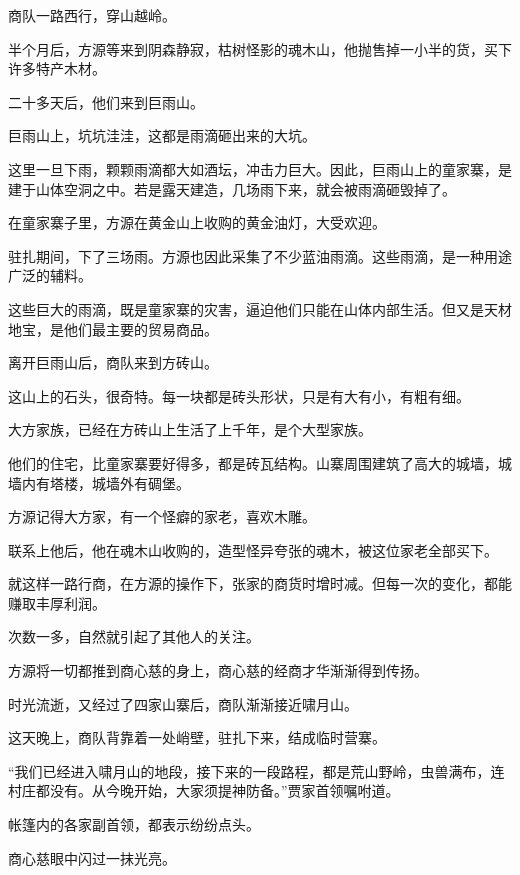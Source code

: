 
\begin{this_body}



商队一路西行，穿山越岭。

半个月后，方源等来到阴森静寂，枯树怪影的魂木山，他抛售掉一小半的货，买下许多特产木材。

二十多天后，他们来到巨雨山。

巨雨山上，坑坑洼洼，这都是雨滴砸出来的大坑。

这里一旦下雨，颗颗雨滴都大如酒坛，冲击力巨大。因此，巨雨山上的童家寨，是建于山体空洞之中。若是露天建造，几场雨下来，就会被雨滴砸毁掉了。

在童家寨子里，方源在黄金山上收购的黄金油灯，大受欢迎。

驻扎期间，下了三场雨。方源也因此采集了不少蓝油雨滴。这些雨滴，是一种用途广泛的辅料。

这些巨大的雨滴，既是童家寨的灾害，逼迫他们只能在山体内部生活。但又是天材地宝，是他们最主要的贸易商品。

离开巨雨山后，商队来到方砖山。

这山上的石头，很奇特。每一块都是砖头形状，只是有大有小，有粗有细。

大方家族，已经在方砖山上生活了上千年，是个大型家族。

他们的住宅，比童家寨要好得多，都是砖瓦结构。山寨周围建筑了高大的城墙，城墙内有塔楼，城墙外有碉堡。

方源记得大方家，有一个怪癖的家老，喜欢木雕。

联系上他后，他在魂木山收购的，造型怪异夸张的魂木，被这位家老全部买下。

就这样一路行商，在方源的操作下，张家的商货时增时减。但每一次的变化，都能赚取丰厚利润。

次数一多，自然就引起了其他人的关注。

方源将一切都推到商心慈的身上，商心慈的经商才华渐渐得到传扬。

时光流逝，又经过了四家山寨后，商队渐渐接近啸月山。

这天晚上，商队背靠着一处峭壁，驻扎下来，结成临时营寨。

“我们已经进入啸月山的地段，接下来的一段路程，都是荒山野岭，虫兽满布，连村庄都没有。从今晚开始，大家须提神防备。”贾家首领嘱咐道。

帐篷内的各家副首领，都表示纷纷点头。

商心慈眼中闪过一抹光亮。


\end{this_body}

